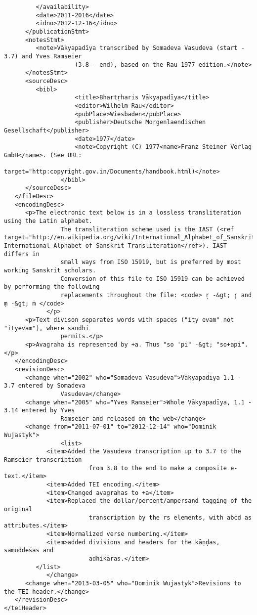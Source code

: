 \documentclass[article,12pt,a4paper]{memoir}%
\begin{document}
\begin{verbatim}
         </availability>
         <date>2011-2016</date>
         <idno>2012-12-16</idno>
      </publicationStmt>
      <notesStmt>
         <note>Vākyapadīya transcribed by Somadeva Vasudeva (start - 3.7) and Yves Ramseier
                    (3.8 - end), based on the Rau 1977 edition.</note>
      </notesStmt>
      <sourceDesc>
         <bibl>
                    <title>Bhartṛharis Vākyapadīya</title>
                    <editor>Wilhelm Rau</editor>
                    <pubPlace>Wiesbaden</pubPlace>
                    <publisher>Deutsche Morgenlaendischen Gesellschaft</publisher>
                    <date>1977</date>
                    <note>Copyright (C) 1977<name>Franz Steiner Verlag GmbH</name>. (See URL:
                        target="http:copyright.gov.in/Documents/handbook.html)</note>
                </bibl>
      </sourceDesc>
   </fileDesc>
   <encodingDesc>
      <p>The electronic text below is in a lossless transliteration using the Latin alphabet.
                The transliteration scheme used is the IAST (<ref target="http://en.wikipedia.org/wiki/International_Alphabet_of_Sanskrit_Transliteration">The International Alphabet of Sanskrit Transliteration</ref>). IAST differs in
                small ways from ISO 15919, but is preferred by most working Sanskrit scholars.
                Conversion of this file to ISO 15919 can be achieved by performing the following
                replacements throughout the file: <code> ṛ -&gt; r̥ and ṃ -&gt; ṁ </code>
            </p>
      <p>Text divison separates words with spaces ("ity evam" not "ityevam"), where sandhi
                permits.</p>
      <p>Avagraha is represented by +a. Thus "so 'pi" -&gt; "so+api".</p>
   </encodingDesc>
   <revisionDesc>
      <change when="2002" who="Somadeva Vasudeva">Vākyapadīya 1.1 - 3.7 entered by Somadeva
                Vasudeva</change>
      <change when="2005" who="Yves Ramseier">Whole Vākyapadīya, 1.1 - 3.14 entered by Yves
                Ramseier and released on the web</change>
      <change from="2011-07-01" to="2012-12-14" who="Dominik Wujastyk">
                <list>
            <item>Added the Vasudeva transcription up to 3.7 to the Ramseier transcription
                        from 3.8 to the end to make a composite e-text.</item>
            <item>Added TEI encoding.</item>
            <item>Changed avagrahas to +a</item>
            <item>Replaced the dollar/percent/ampersand tagging of the original
                        transcription by the rs elements, with abcd as attributes.</item>
            <item>Normalized verse numbering.</item>
            <item>added divisions and headers for the kāṇḍas, samuddeśas and
                        adhikāras.</item>
         </list>
            </change>
      <change when="2013-03-05" who="Dominik Wujastyk">Revisions to the TEI header.</change>
   </revisionDesc>
</teiHeader>
	 \end{verbatim}
       
      \clearpage
      \begin{english}
      \printshorthands
      \printbibliography
      \end{english}
    
\end{document}
